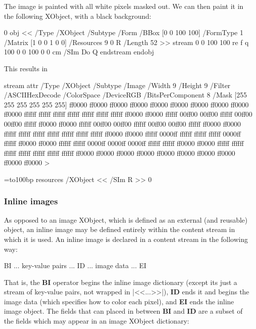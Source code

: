 The image is painted with all white pixels masked out.
We can then paint it in the following XObject, with a black background:

 0 obj
<<
    /Type /XObject
    /Subtype /Form
    /BBox [0 0 100 100]
    /FormType 1
    /Matrix [1 0 0 1 0 0]
    /Resources 9 0 R
    /Length 52        
>>
stream
0 0 100 100 re f
q 100 0 0 100 0 0 cm /SIm Do Q
endstream
endobj
\elisting

This results in

\bgroup
\immediate\pdfobj stream attr{
    /Type /XObject
    /Subtype /Image
    /Width 9
    /Height 9
    /Filter /ASCIIHexDecode
    /ColorSpace /DeviceRGB
    /BitsPerComponent 8
    /Mask [255 255 255 255 255 255]
}{
    ff0000 ff0000 ff0000 ff0000 ff0000 ff0000 ff0000 ff0000 ff0000 
    ff0000 ffffff ffffff ffffff ffffff ffffff ffffff ffffff ff0000 
    ff0000 ffffff 00ff00 00ff00 ffffff 00ff00 00ff00 ffffff ff0000 
    ff0000 ffffff 00ff00 00ff00 ffffff 00ff00 00ff00 ffffff ff0000 
    ff0000 ffffff ffffff ffffff ffffff ffffff ffffff ffffff ff0000 
    ff0000 ffffff 0000ff ffffff ffffff ffffff 0000ff ffffff ff0000 
    ff0000 ffffff ffffff 0000ff 0000ff 0000ff ffffff ffffff ff0000 
    ff0000 ffffff ffffff ffffff ffffff ffffff ffffff ffffff ff0000 
    ff0000 ff0000 ff0000 ff0000 ff0000 ff0000 ff0000 ff0000 ff0000 >
}

=\hbox to100bp{%
\kern100bp}
\pdfxform resources{
    /XObject << /SIm \the\pdflastobj{} R >>
}0

\centerline{\pdfrefxform\pdflastxform}
\egroup

\subsubsection{Inline images}

As opposed to an image XObject, which is defined as an external (and reusable) object, an inline image may be
defined entirely within the content stream in which it is used.
An inline image is declared in a content stream in the following way:

\blisting
BI  %
... key-value pairs ...
ID  %
... image data ...
EI  %
\elisting

\noindent That is, the {\bf BI} operator begins the inline image dictionary (except its just a stream of
key-value pairs, not wrapped in \inlinecode|<<...>>|), {\bf ID} ends it and begins the image data (which
specifies how to color each pixel), and {\bf EI} ends the inline image object.
The fields that can placed in between {\bf BI} and {\bf ID} are a subset of the fields which may appear in
an image XObject dictionary:

